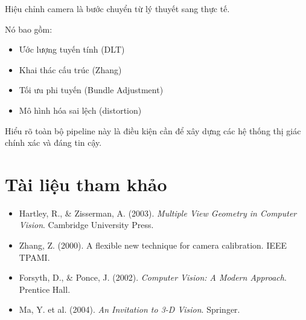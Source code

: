 Hiệu chỉnh camera là bước chuyển từ lý thuyết sang thực tế.

Nó bao gồm:
\begin{itemize}
	\item Ước lượng tuyến tính (DLT)
	\item Khai thác cấu trúc (Zhang)
	\item Tối ưu phi tuyến (Bundle Adjustment)
	\item Mô hình hóa sai lệch (distortion)
\end{itemize}

Hiểu rõ toàn bộ pipeline này là điều kiện cần để xây dựng các hệ thống thị giác chính xác và đáng tin cậy.

\section*{Tài liệu tham khảo}
\begin{itemize}
	\item[1] Hartley, R., \& Zisserman, A. (2003). \textit{Multiple View Geometry in Computer Vision}. Cambridge University Press.
	\item[2] Zhang, Z. (2000). A flexible new technique for camera calibration. IEEE TPAMI.
	\item[3] Forsyth, D., \& Ponce, J. (2002). \textit{Computer Vision: A Modern Approach}. Prentice Hall.
	\item[4] Ma, Y. et al. (2004). \textit{An Invitation to 3-D Vision}. Springer.
\end{itemize}